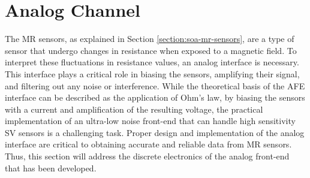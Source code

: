 
\label{chapter:fe-interface}

\clearpage

\section{Analog Channel}
\label{chapter:fe-channel}

The \ac{MR} sensors, as explained in Section \ref{section:soa-mr-sensors}, are a type of sensor that undergo changes in resistance when exposed to a magnetic field. To interpret these fluctuations in resistance values, an analog interface is necessary. This interface plays a critical role in biasing the sensors, amplifying their signal, and filtering out any noise or interference. While the theoretical basis of the \ac{AFE} interface can be described as the application of Ohm's law, by biasing the sensors with a current and amplification of the resulting voltage, the practical implementation of an ultra-low noise front-end that can handle high sensitivity \ac{SV} sensors is a challenging task. Proper design and implementation of the analog interface are critical to obtaining accurate and reliable data from \ac{MR} sensors. Thus, this section will address the discrete electronics of the analog front-end that has been developed.

